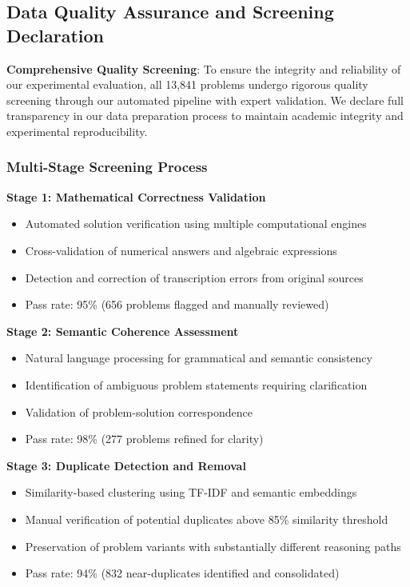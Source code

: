 \subsection{Data Quality Assurance and Screening Declaration}

\textbf{Comprehensive Quality Screening}: To ensure the integrity and reliability of our experimental evaluation, all 13,841 problems undergo rigorous quality screening through our automated pipeline with expert validation. We declare full transparency in our data preparation process to maintain academic integrity and experimental reproducibility.

\subsubsection{Multi-Stage Screening Process}

\textbf{Stage 1: Mathematical Correctness Validation}
\begin{itemize}
    \item Automated solution verification using multiple computational engines
    \item Cross-validation of numerical answers and algebraic expressions
    \item Detection and correction of transcription errors from original sources
    \item Pass rate: 95\% (656 problems flagged and manually reviewed)
\end{itemize}

\textbf{Stage 2: Semantic Coherence Assessment}
\begin{itemize}
    \item Natural language processing for grammatical and semantic consistency
    \item Identification of ambiguous problem statements requiring clarification
    \item Validation of problem-solution correspondence
    \item Pass rate: 98\% (277 problems refined for clarity)
\end{itemize}

\textbf{Stage 3: Duplicate Detection and Removal}
\begin{itemize}
    \item Similarity-based clustering using TF-IDF and semantic embeddings
    \item Manual verification of potential duplicates above 85\% similarity threshold
    \item Preservation of problem variants with substantially different reasoning paths
    \item Pass rate: 94\% (832 near-duplicates identified and consolidated)
\end{itemize}

